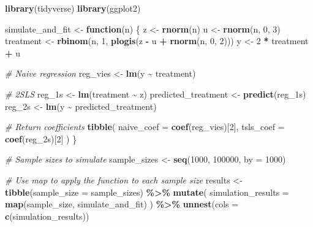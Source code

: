 \documentclass[
]{article}
\newenvironment{Shaded}{\begin{snugshade}}{\end{snugshade}}
\newcommand{\AttributeTok}[1]{\textcolor[rgb]{0.13,0.29,0.53}{#1}}
\newcommand{\CommentTok}[1]{\textcolor[rgb]{0.56,0.35,0.01}{\textit{#1}}}
\newcommand{\ControlFlowTok}[1]{\textcolor[rgb]{0.13,0.29,0.53}{\textbf{#1}}}
\newcommand{\DecValTok}[1]{\textcolor[rgb]{0.00,0.00,0.81}{#1}}
\newcommand{\FunctionTok}[1]{\textcolor[rgb]{0.13,0.29,0.53}{\textbf{#1}}}
\newcommand{\NormalTok}[1]{#1}
\newcommand{\OtherTok}[1]{\textcolor[rgb]{0.56,0.35,0.01}{#1}}
\newcommand{\SpecialCharTok}[1]{\textcolor[rgb]{0.81,0.36,0.00}{\textbf{#1}}}
\begin{document}
\begin{Shaded}
\begin{Highlighting}[]
\FunctionTok{library}\NormalTok{(tidyverse)}
\FunctionTok{library}\NormalTok{(ggplot2)}

\NormalTok{simulate\_and\_fit }\OtherTok{\textless{}{-}} \ControlFlowTok{function}\NormalTok{(n) \{}
\NormalTok{  z }\OtherTok{\textless{}{-}} \FunctionTok{rnorm}\NormalTok{(n)}
\NormalTok{  u }\OtherTok{\textless{}{-}} \FunctionTok{rnorm}\NormalTok{(n, }\DecValTok{0}\NormalTok{, }\DecValTok{3}\NormalTok{)}
\NormalTok{  treatment }\OtherTok{\textless{}{-}} \FunctionTok{rbinom}\NormalTok{(n, }\DecValTok{1}\NormalTok{, }\FunctionTok{plogis}\NormalTok{(z }\SpecialCharTok{{-}}\NormalTok{ u }\SpecialCharTok{+} \FunctionTok{rnorm}\NormalTok{(n, }\DecValTok{0}\NormalTok{, }\DecValTok{2}\NormalTok{)))}
\NormalTok{  y }\OtherTok{\textless{}{-}} \DecValTok{2} \SpecialCharTok{*}\NormalTok{ treatment }\SpecialCharTok{+}\NormalTok{ u}
  
  \CommentTok{\# Naive regression}
\NormalTok{  reg\_vies }\OtherTok{\textless{}{-}} \FunctionTok{lm}\NormalTok{(y }\SpecialCharTok{\textasciitilde{}}\NormalTok{ treatment)}
  
  \CommentTok{\# 2SLS}
\NormalTok{  reg\_1s }\OtherTok{\textless{}{-}} \FunctionTok{lm}\NormalTok{(treatment }\SpecialCharTok{\textasciitilde{}}\NormalTok{ z)}
\NormalTok{  predicted\_treatment }\OtherTok{\textless{}{-}} \FunctionTok{predict}\NormalTok{(reg\_1s)}
\NormalTok{  reg\_2s }\OtherTok{\textless{}{-}} \FunctionTok{lm}\NormalTok{(y }\SpecialCharTok{\textasciitilde{}}\NormalTok{ predicted\_treatment)}
  
  \CommentTok{\# Return coefficients}
  \FunctionTok{tibble}\NormalTok{(}
    \AttributeTok{naive\_coef =} \FunctionTok{coef}\NormalTok{(reg\_vies)[}\DecValTok{2}\NormalTok{],}
    \AttributeTok{tsls\_coef =} \FunctionTok{coef}\NormalTok{(reg\_2s)[}\DecValTok{2}\NormalTok{]}
\NormalTok{  )}
\NormalTok{\}}


\CommentTok{\# Sample sizes to simulate}
\NormalTok{sample\_sizes }\OtherTok{\textless{}{-}} \FunctionTok{seq}\NormalTok{(}\DecValTok{1000}\NormalTok{, }\DecValTok{100000}\NormalTok{, }\AttributeTok{by =} \DecValTok{1000}\NormalTok{)}

\CommentTok{\# Use map to apply the function to each sample size}
\NormalTok{results }\OtherTok{\textless{}{-}} \FunctionTok{tibble}\NormalTok{(}\AttributeTok{sample\_size =}\NormalTok{ sample\_sizes) }\SpecialCharTok{\%\textgreater{}\%}
  \FunctionTok{mutate}\NormalTok{(}
    \AttributeTok{simulation\_results =} \FunctionTok{map}\NormalTok{(sample\_size, simulate\_and\_fit)}
\NormalTok{  ) }\SpecialCharTok{\%\textgreater{}\%}
  \FunctionTok{unnest}\NormalTok{(}\AttributeTok{cols =} \FunctionTok{c}\NormalTok{(simulation\_results))}


\end{Highlighting}
\end{Shaded}
\end{document}
